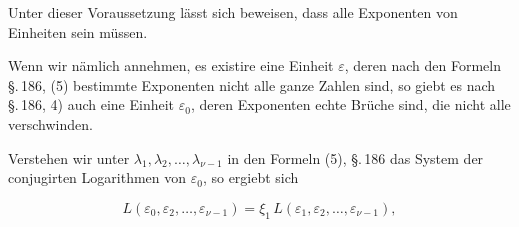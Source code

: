 Unter dieser Voraussetzung lässt sich beweisen, dass
alle Exponenten von Einheiten  sein müssen.

Wenn wir nämlich annehmen, es existire eine Einheit $\varepsilon$,
deren nach den Formeln \S.\,186, (5) bestimmte Exponenten nicht
alle ganze Zahlen sind, so giebt es nach \S.\,186, 4) auch eine
Einheit $\varepsilon_0$, deren Exponenten echte Brüche sind, die nicht alle
verschwinden.

Verstehen wir unter $\lambda_1, \lambda_2, \ldots, \lambda_{\nu-1}$ in den Formeln (5),
\S.\,186 das System der conjugirten Logarithmen von $\varepsilon_0$, so ergiebt
 sich

\[
L(\varepsilon_0, \varepsilon_2, \ldots, \varepsilon_{\nu-1}) = \xi_1\, L(\varepsilon_1, \varepsilon_2, \ldots, \varepsilon_{\nu-1}),
\]
